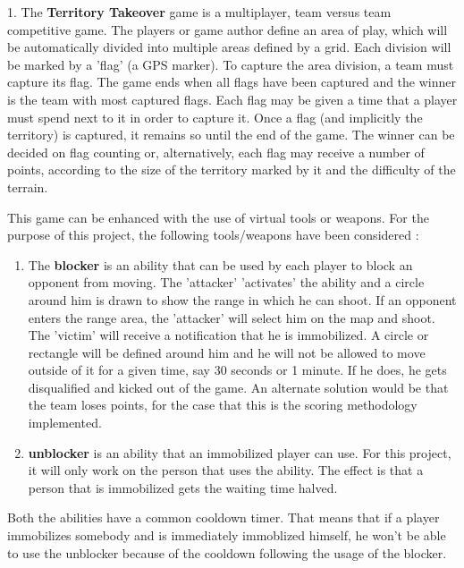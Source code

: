 1. The \textbf{Territory Takeover} game is a multiplayer, team versus team
competitive game. The players or game author define an area of play, which will
be automatically divided into multiple areas defined by a grid. Each division
will be marked by a 'flag' (a GPS marker). To capture the area division, a team
must capture its flag. The game ends when all flags have been captured and the
winner is the team with most captured flags. Each flag may be given a time that
a player must spend next to it in order to capture it. Once a flag (and
implicitly the territory) is captured, it remains so until the end of the game.
The winner can be decided on flag counting or, alternatively, each flag may
receive a number of points, according to the size of the territory marked by it
and the difficulty of the terrain. \newline

This game can be enhanced with the use of virtual tools or weapons. For the
purpose of this project, the following tools/weapons have been considered :
\begin{enumerate}
	
	\item The \textbf{blocker} is an ability that can be used by each player to
	block an opponent from moving. The 'attacker' 'activates' the ability and a
	circle around him is drawn to show the range in which he can shoot. If an
	opponent enters the range area, the 'attacker' will select him on the map and
	shoot. The 'victim' will receive a notification that he is immobilized. A
	circle or rectangle will be defined around him and he will not be allowed to
	move outside of it for a given time, say 30 seconds or 1 minute. If he does, he
	gets disqualified and kicked out of the game. An alternate solution would be
	that the team loses points, for the case that this is the scoring methodology
	implemented.
	 
	\item \textbf{unblocker} is an ability that an immobilized player can use.
	For this project, it will only work on the person that uses the ability. The
	effect is that a person that is immobilized gets the waiting time halved.
	
\end{enumerate}
Both the abilities have a common cooldown timer. That means that if a player
immobilizes somebody and is immediately immoblized himself, he won't be able to
use the unblocker because of the cooldown following the usage of the
blocker.\newline

